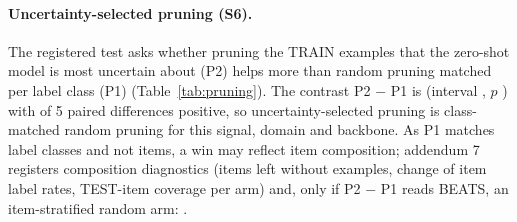 \paragraph{Uncertainty-selected pruning (S6).}
The registered test asks whether pruning the TRAIN examples that the zero-shot model is most uncertain about (P2) helps more than
random pruning matched per label class (P1) (Table~\ref{tab:pruning}). The contrast P2 $-$ P1 is 
(interval , $p$ ) with  of 5 paired
differences positive, so uncertainty-selected pruning is 
class-matched random pruning for this signal, domain and backbone. As P1 matches label classes and not items, a win may reflect item
composition; addendum 7 registers composition diagnostics (items left without examples, change of item label rates, TEST-item
coverage per arm) and, only if P2 $-$ P1 reads BEATS, an item-stratified random arm: .

\begin{table}[!htbp]
\caption{Pruning (S6), ML-1M, Qwen3-8B LoRA, TEST UAUC: mean (seed s.d.); each pruned arm removes 25\% of each label class;
$\Delta$: seed-averaged contrast; $>0$: positive paired differences of 5.}
\label{tab:pruning}
\centering\scriptsize\setlength{\tabcolsep}{3pt}\renewcommand{\arraystretch}{0.9}
\end{table}

